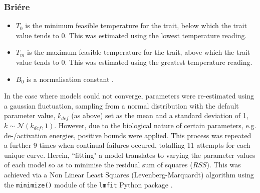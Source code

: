 \documentclass[11pt]{article}
\begin{document}
            \subsubsection{Bri\'ere}
                \begin{itemize}
                    \item $T_0$ is the minimum feasible temperature for the trait, below which the trait value tends to 0. This was estimated using the lowest temperature reading.
                    \item $T_m$ is the maximum feasible temperature for the trait, above which the trait value tends to 0. This was estimated using the greatest temperature reading.
                    \item $B_0$ is a normalisation constant \cite{feller2008introduction}.
                \end{itemize}

            In the case where models could not converge, parameters were re-estimated using a gaussian fluctuation, sampling from a normal distribution with the default parameter value, $k_{def}$ (as above) set as the mean and a standard deviation of 1,  $k \sim \mathcal{N}(k_{def}, 1)$. However, due to the biological nature of certain parameters, e.g. de-/activation energies, positive bounds were applied. This process was repeated a further 9 times when continual failures occured, totalling 11 attempts for each unique curve.
            Herein, ``fitting" a model translates to varying the parameter values of each model so as to minimise the residual sum of squares ($RSS$). This was achieved via a Non Linear Least Squares (Levenberg-Marquardt) algorithm using the \texttt{minimize()} module of the \texttt{lmfit} Python package . 
\end{document}
